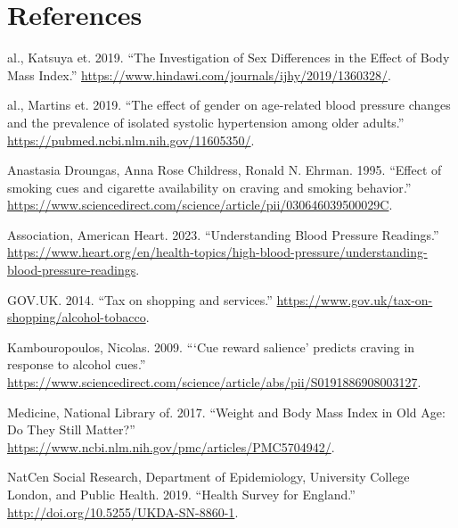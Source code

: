 \documentclass[
  11pt,
  twocolumn]{article}
\newlength{\cslhangindent}
\newlength{\cslentryspacingunit} %
\newenvironment{CSLReferences}[2] %
 {%
  \setlength{\parindent}{0pt}
  \ifodd #1
  \let\oldpar\par
  \def\par{\hangindent=\cslhangindent\oldpar}
  \fi
  \setlength{\parskip}{#2\cslentryspacingunit}
 }%
 {}
\begin{document}
\clearpage
\onecolumn

\hypertarget{references}{%
\section*{References}\label{references}}

\hypertarget{refs}{}
\begin{CSLReferences}{1}{0}
\leavevmode{}%
al., Katsuya et. 2019. {``{The Investigation of Sex Differences in the
Effect of Body Mass Index}.''}
\url{https://www.hindawi.com/journals/ijhy/2019/1360328/}.

\leavevmode{}%
al., Martins et. 2019. {``{The effect of gender on age-related blood
pressure changes and the prevalence of isolated systolic hypertension
among older adults}.''} \url{https://pubmed.ncbi.nlm.nih.gov/11605350/}.

\leavevmode{}%
Anastasia Droungas, Anna Rose Childress, Ronald N. Ehrman. 1995.
{``{Effect of smoking cues and cigarette availability on craving and
smoking behavior}.''}
\url{https://www.sciencedirect.com/science/article/pii/030646039500029C}.

\leavevmode{}%
Association, American Heart. 2023. {``{Understanding Blood Pressure
Readings}.''}
\url{https://www.heart.org/en/health-topics/high-blood-pressure/understanding-blood-pressure-readings}.

\leavevmode{}%
GOV.UK. 2014. {``{Tax on shopping and services}.''}
\url{https://www.gov.uk/tax-on-shopping/alcohol-tobacco}.

\leavevmode{}%
Kambouropoulos, Nicolas. 2009. {``{{`Cue reward salience'} predicts
craving in response to alcohol cues}.''}
\url{https://www.sciencedirect.com/science/article/abs/pii/S0191886908003127}.

\leavevmode{}%
Medicine, National Library of. 2017. {``{Weight and Body Mass Index in
Old Age: Do They Still Matter?}''}
\url{https://www.ncbi.nlm.nih.gov/pmc/articles/PMC5704942/}.

\leavevmode{}%
NatCen Social Research, Department of Epidemiology, University College
London, and Public Health. 2019. {``{Health Survey for England}.''}
\url{http://doi.org/10.5255/UKDA-SN-8860-1}.


\end{CSLReferences}
\end{document}
